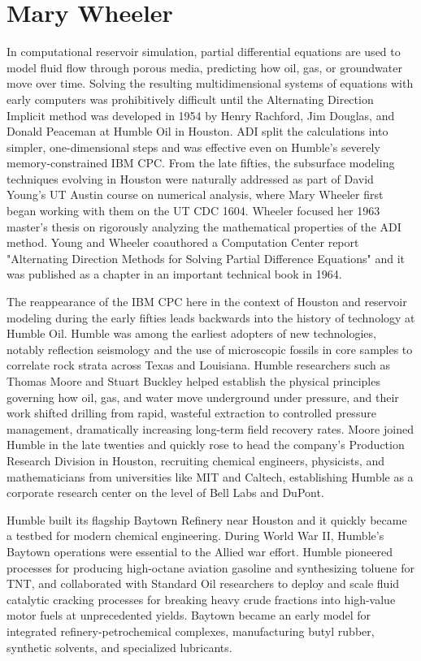 \chapter{Mary Wheeler}

In computational reservoir simulation, partial differential equations are used to model fluid flow through porous media, predicting how oil, gas, or groundwater move over time. Solving the resulting multidimensional systems of equations with early computers was prohibitively difficult until the Alternating Direction Implicit method was developed in 1954 by Henry Rachford, Jim Douglas, and Donald Peaceman at Humble Oil in Houston. ADI split the calculations into simpler, one-dimensional steps and was effective even on Humble's severely memory-constrained IBM CPC. From the late fifties, the subsurface modeling techniques evolving in Houston were naturally addressed as part of David Young’s UT Austin course on numerical analysis, where Mary Wheeler first began working with them on the UT CDC 1604. Wheeler focused her 1963 master's thesis on rigorously analyzing the mathematical properties of the ADI method. Young and Wheeler coauthored a Computation Center report "Alternating Direction Methods for Solving Partial Difference Equations" and it was published as a chapter in an important technical book in 1964. \cite{wheelerAlternatingDirectionMethods1964}

The reappearance of the IBM CPC here in the context of Houston and reservoir modeling during the early fifties leads backwards into the history of technology at Humble Oil. Humble was among the earliest adopters of new technologies, notably reflection seismology and the use of microscopic fossils in core samples to correlate rock strata across Texas and Louisiana. Humble researchers such as Thomas Moore and Stuart Buckley helped establish the physical principles governing how oil, gas, and water move underground under pressure, and their work shifted drilling from rapid, wasteful extraction to controlled pressure management, dramatically increasing long-term field recovery rates. Moore joined Humble in the late twenties and quickly rose to head the company’s Production Research Division in Houston, recruiting chemical engineers, physicists, and mathematicians from universities like MIT and Caltech, establishing Humble as a corporate research center on the level of Bell Labs and DuPont. \cite{prattExxonTransformingEnergy2013} \cite{larsonHistoryHumbleOil1959}

Humble built its flagship Baytown Refinery near Houston and it quickly became a testbed for modern chemical engineering. During World War II, Humble’s Baytown operations were essential to the Allied war effort. Humble pioneered processes for producing high-octane aviation gasoline and synthesizing toluene for TNT, and collaborated with Standard Oil researchers to deploy and scale fluid catalytic cracking processes for breaking heavy crude fractions into high-value motor fuels at unprecedented yields. Baytown became an early model for integrated refinery-petrochemical complexes, manufacturing butyl rubber, synthetic solvents, and specialized lubricants.

